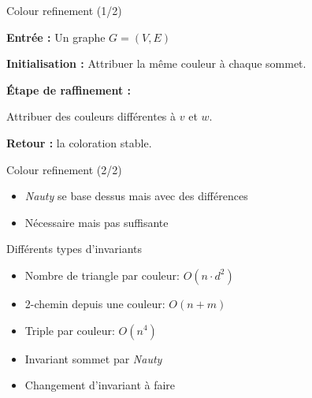 \documentclass[11pt]{beamer}
\begin{document}
\begin{frame}{Colour refinement (1/2)}
    \begin{algorithmic}[1]

        \State \textbf{Entrée :} Un graphe $G=(V,E)$

        \State \textbf{Initialisation :} Attribuer la même couleur à chaque sommet.

        \Repeat

            \State \textbf{Étape de raffinement :}



                    \State Attribuer des couleurs différentes à $v$ et $w$.

                \EndIf

            \EndFor


        \State \textbf{Retour :} la coloration stable.

    \end{algorithmic}


\end{frame}

\begin{frame}{Colour refinement (2/2)}

\begin{itemize}
    \item \textit{Nauty} se base dessus mais avec des différences
    \item Nécessaire mais pas suffisante
\end{itemize}
    
\end{frame}

\begin{frame}{Différents types d'invariants}

\begin{itemize}
    \item Nombre de triangle par couleur: $O(n \cdot d^2)$
    \item 2-chemin depuis une couleur: $O(n+m)$
    \item Triple par couleur: $O(n^4)$
    \item Invariant sommet par \textit{Nauty}
    \item Changement d'invariant à faire
\end{itemize}
    
\end{frame}
\end{document}
